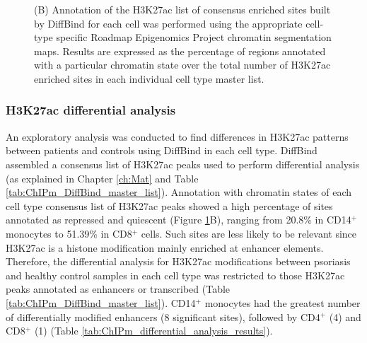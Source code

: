 \begin{figure}[htbp]
{(B) Annotation of the H3K27ac list of consensus enriched sites built by DiffBind for each cell was performed using the appropriate cell-type specific Roadmap Epigenomics Project chromatin segmentation maps. Results are expressed as the percentage of regions annotated with a particular chromatin state over the total number of H3K27ac enriched sites in each individual cell type master list.}
\label{figure:ChIPm_PCA_and_chromatin_states}
\end{figure}


\subsubsection{H3K27ac differential analysis}
An exploratory analysis was conducted to find differences in H3K27ac patterns between patients and controls using DiffBind in each cell type. DiffBind assembled a consensus list of H3K27ac peaks used to perform differential analysis (as explained in Chapter \ref{ch:Mat} and Table \ref{tab:ChIPm_DiffBind_master_list}). Annotation with chromatin states of each cell type consensus list of H3K27ac peaks showed a high percentage of sites annotated as repressed and quiescent (Figure \ref{figure:ChIPm_PCA_and_chromatin_states}B), ranging from 20.8\% in CD14$^+$ monocytes to 51.39\% in CD8$^+$ cells. Such sites are less likely to be relevant since H3K27ac is a histone modification mainly enriched at enhancer elements. Therefore, the differential analysis for H3K27ac modifications between psoriasis and healthy control samples in each cell type was restricted to those H3K27ac peaks annotated as enhancers or transcribed (Table \ref{tab:ChIPm_DiffBind_master_list}). CD14$^+$ monocytes had the greatest number of differentially modified enhancers (8 significant sites), followed by CD4$^+$ (4) and CD8$^+$ (1) (Table \ref{tab:ChIPm_differential_analysis_results}).




